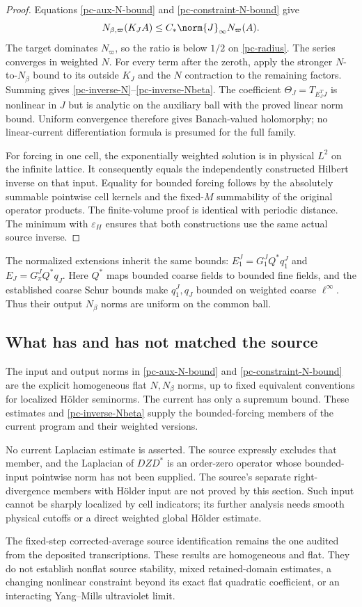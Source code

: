 \begin{proof}
Equations \eqref{pc-aux-N-bound} and
\eqref{pc-constraint-N-bound} give
\[
 N_{\beta,\varpi}(K_JA)
          \le C_*\norm{J}_\infty N_\varpi(A).
\]
The target dominates $N_\varpi$, so the ratio is below $1/2$
on \eqref{pc-radius}. The series converges in weighted $N$.
For every term after the zeroth, apply the stronger $N$-to-$N_\beta$
bound to its outside $K_J$ and the $N$ contraction to the remaining
factors. Summing gives \eqref{pc-inverse-N}--\eqref{pc-inverse-Nbeta}.
The coefficient $\Theta_J=T_{E_J^TJ}$ is nonlinear in $J$ but is
analytic on the auxiliary ball with the proved linear norm bound.
Uniform convergence therefore gives Banach-valued holomorphy; no
linear-current differentiation formula is presumed for the full family.

For forcing in one cell, the exponentially weighted solution is in
physical $L^2$ on the infinite lattice. It consequently equals the
independently constructed Hilbert inverse on that input. Equality
for bounded forcing follows by the absolutely summable pointwise
cell kernels and the fixed-$M$ summability of the original operator
products. The finite-volume proof is identical with periodic
distance. The minimum with $\varepsilon_H$ ensures that both
constructions use the same actual source inverse.
\end{proof}

The normalized extensions inherit the same bounds:
$E_1^J=G_1^JQ^*q_1^J$ and $E_J=G_\pi^JQ^*q_J$.
Here $Q^*$ maps bounded coarse fields to bounded fine fields, and
the established coarse Schur bounds make $q_1^J,q_J$ bounded on
weighted coarse $\ell^\infty$. Thus their output $N_\beta$ norms
are uniform on the common ball.

\subsection{What has and has not matched the source}

The input and output norms in \eqref{pc-aux-N-bound} and
\eqref{pc-constraint-N-bound} are the explicit homogeneous flat
$N,N_\beta$ norms, up to fixed equivalent conventions for localized
H\"older seminorms. The current has only a supremum bound. These
estimates and \eqref{pc-inverse-Nbeta} supply the bounded-forcing
members of the current program and their weighted versions.

No current Laplacian estimate is asserted. The source expressly
excludes that member, and the Laplacian of $DZD^*$ is an order-zero
operator whose bounded-input pointwise norm has not been supplied.
The source's separate right-divergence members with H\"older input
are not proved by this section. Such input cannot be sharply
localized by cell indicators; its further analysis needs smooth
physical cutoffs or a direct weighted global H\"older estimate.

The fixed-step corrected-average source identification remains the
one audited from the deposited transcriptions. These results are
homogeneous and flat. They do not establish nonflat source stability,
mixed retained-domain estimates, a changing nonlinear constraint
beyond its exact flat quadratic coefficient, or an interacting
Yang--Mills ultraviolet limit.
